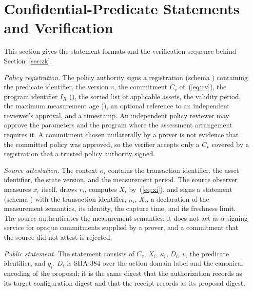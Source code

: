 \section{Confidential-Predicate Statements and Verification}
\label{s:zkstatement}
This section gives the statement formats and the verification sequence behind Section~\ref{sec:zk}.

\emph{Policy registration.} The policy authority signs a registration (schema ) containing the predicate identifier, the version $v$, the commitment $C_v$ of~(\ref{eq:cv}), the program identifier $I_R$ (), the sorted list of applicable assets, the validity period, the maximum measurement age (), an optional reference to an independent reviewer's approval, and a timestamp. An independent policy reviewer may approve the parameters and the program where the assessment arrangement requires it. A commitment chosen unilaterally by a prover is not evidence that the committed policy was approved, so the verifier accepts only a $C_v$ covered by a registration that a trusted policy authority signed.

\emph{Source attestation.} The context $\kappa_i$ contains the transaction identifier, the asset identifier, the state version, and the measurement period. The source observer measures $x_i$ itself, draws $r_i$, computes $X_i$ by~(\ref{eq:xi}), and signs a statement (schema ) with the transaction identifier, $\kappa_i$, $X_i$, a declaration of the measurement semantics, its identity, the capture time, and its freshness limit. The source authenticates the measurement semantics; it does not act as a signing service for opaque commitments supplied by a prover, and a commitment that the source did not attest is rejected.

\emph{Public statement.} The statement consists of $C_v$, $X_i$, $\kappa_i$, $D_i$, $v$, the predicate identifier, and $q_i$. $D_i$ is SHA-384 over the action domain label and the canonical encoding of the proposal; it is the same digest that the authorization records as its target configuration digest and that the receipt records as its proposal digest.

